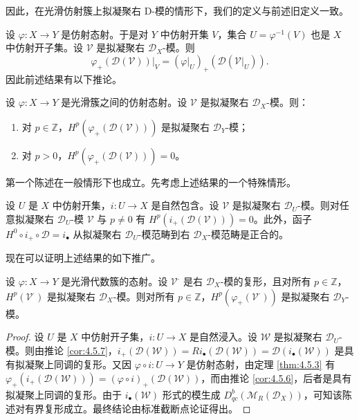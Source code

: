 因此，在光滑仿射簇上拟凝聚右 D-模的情形下，我们的定义与前述旧定义一致。

设 $\varphi:X\to Y$ 是仿射态射。于是对 $Y$ 中仿射开集 $V$，集合 $U=\varphi^{-1}(V)$ 也是 $X$ 中仿射开子集。设 $\mathcal{V}$ 是拟凝聚右 $\mathcal{D}_X$-模。则
$$\varphi_+(\mathcal{D}(\mathcal{V}))|_V=(\varphi|_U)_+(\mathcal{D}(\mathcal{V}|_U)).$$
因此前述结果有以下推论。

\begin{corollary}\label{cor:4.5.6}
设 $\varphi:X\to Y$ 是光滑簇之间的仿射态射。设 $\mathcal{V}$ 是拟凝聚右 $\mathcal{D}_X$-模。则：
\begin{enumerate}[label=(\roman*)]
  \item 对 $p\in\mathbb{Z}$，$H^p(\varphi_+(\mathcal{D}(\mathcal{V})))$ 是拟凝聚右 $\mathcal{D}_Y$-模；
  \item 对 $p>0$，$H^p(\varphi_+(\mathcal{D}(\mathcal{V})))=0$。
\end{enumerate}
\end{corollary}

第一个陈述在一般情形下也成立。先考虑上述结果的一个特殊情形。

\begin{corollary}\label{cor:4.5.7}
设 $U$ 是 $X$ 中仿射开集，$i:U\to X$ 是自然包含。设 $\mathcal{V}$ 是拟凝聚右 $\mathcal{D}_U$-模。则对任意拟凝聚右 $\mathcal{D}_U$-模 $\mathcal{V}$ 与 $p\ne 0$ 有 $H^p(i_+(\mathcal{D}(\mathcal{V})))=0$。此外，函子 $H^0\circ i_+\circ\mathcal{D}=i_\bullet$ 从拟凝聚右 $\mathcal{D}_U$-模范畴到右 $\mathcal{D}_X$-模范畴是正合的。
\end{corollary}

现在可以证明上述结果的如下推广。

\begin{theorem}\label{thm:4.5.8}
设 $\varphi:X\to Y$ 是光滑代数簇的态射。设 $\mathcal{V}^\cdot$ 是右 $\mathcal{D}_X$-模的复形，且对所有 $p\in\mathbb{Z}$，$H^p(\mathcal{V}^\cdot)$ 是拟凝聚右 $\mathcal{D}_X$-模。则对所有 $p\in\mathbb{Z}$，$H^p(\varphi_+(\mathcal{V}^\cdot))$ 是拟凝聚右 $\mathcal{D}_Y$-模。
\end{theorem}

\begin{proof}
设 $U$ 是 $X$ 中仿射开子集，$i:U\to X$ 是自然浸入。设 $\mathcal{W}$ 是拟凝聚右 $\mathcal{D}_U$-模。则由推论 \ref{cor:4.5.7}，$i_+(\mathcal{D}(\mathcal{W}))=Ri_\bullet(\mathcal{D}(\mathcal{W}))=\mathcal{D}(i_\bullet(\mathcal{W}))$ 是具有拟凝聚上同调的复形。又因 $\varphi\circ i:U\to Y$ 是仿射态射，由定理 \ref{thm:4.5.3} 有
$\varphi_+(i_+(\mathcal{D}(\mathcal{W})))=(\varphi\circ i)_+(\mathcal{D}(\mathcal{W}))$，而由推论 \ref{cor:4.5.6}，后者是具有拟凝聚上同调的复形。由于 $i_\bullet(\mathcal{W})$ 形式的模生成 $D^b_{qc}(\mathcal{M}_R(\mathcal{D}_X))$，可知该陈述对有界复形成立。最终结论由标准截断点论证得出。
\end{proof}

